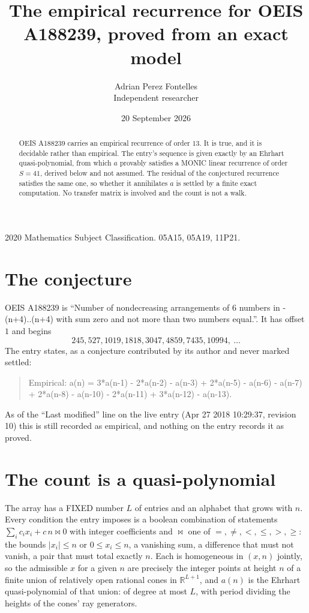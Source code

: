 \documentclass[11pt,a4paper]{article}
\title{The empirical recurrence for OEIS A188239, proved from an exact model}
\author{Adrian Perez Fontelles\\ \small Independent researcher}
\date{20 September 2026}
\theoremstyle{plain}
\theoremstyle{definition}
\begin{document}
\maketitle

\begin{abstract}
OEIS A188239 carries an empirical recurrence of order $13$. It is true, and it is
decidable rather than empirical. The entry's sequence is given exactly by an Ehrhart quasi-polynomial, from
which $a$ provably satisfies a MONIC linear recurrence of order $S=41$, derived below and not
assumed. The residual of the conjectured recurrence satisfies the same one, so whether it
annihilates $a$ is settled by a finite exact computation. No transfer matrix is involved and the count is not a walk.
\end{abstract}

\noindent\small 2020 Mathematics Subject Classification. 05A15, 05A19, 11P21.\normalsize

\section{The conjecture}

OEIS A188239 is ``Number of nondecreasing arrangements of 6 numbers in -(n+4)..(n+4) with sum zero and not more than two numbers equal.''. It has offset $1$ and begins
\[
245, 527, 1019, 1818, 3047, 4859, 7435, 10994,\ \dots
\]
The entry states, as a conjecture contributed by its author and never marked settled:
\begin{quote}
Empirical: a(n) = 3*a(n-1) - 2*a(n-2) - a(n-3) + 2*a(n-5) - a(n-6) - a(n-7) + 2*a(n-8) - a(n-10) - 2*a(n-11) + 3*a(n-12) - a(n-13).
\end{quote}
As of the ``Last modified'' line on the live entry (Apr 27 2018 10:29:37, revision 10)
this is still recorded as empirical, and nothing on the entry records it as proved.

\section{The count is a quasi-polynomial}

The array has a FIXED number $L$ of entries and an alphabet that grows with $n$. Every
condition the entry imposes is a boolean combination of statements
$\sum_i c_ix_i + c\,n \bowtie 0$ with integer coefficients and $\bowtie$ one of
$=,\ne,<,\le,>,\ge$: the bounds $|x_i|\le n$ or $0\le x_i\le n$, a vanishing sum, a difference
that must not vanish, a pair that must total exactly $n$. Each is homogeneous in $(x,n)$
jointly, so the admissible $x$ for a given $n$ are precisely the integer points at height $n$
of a finite union of relatively open rational cones in $\mathbb{R}^{L+1}$, and $a(n)$ is
the Ehrhart quasi-polynomial of that union: of degree at most $L$, with period dividing the
heights of the cones' ray generators.
\end{document}
